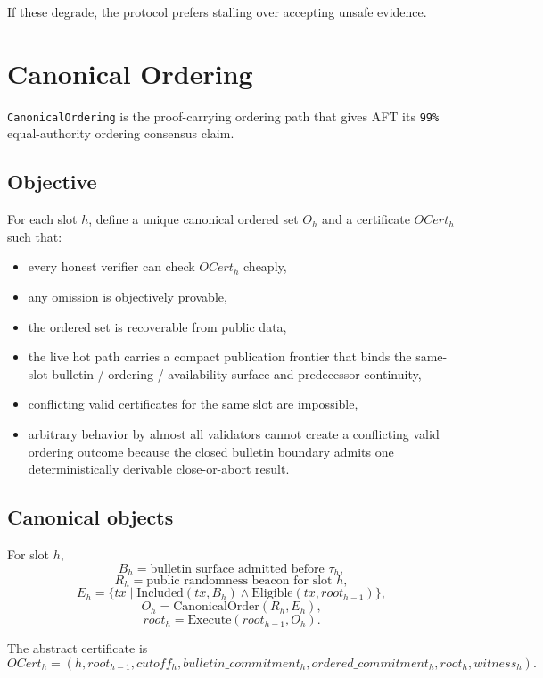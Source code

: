 \documentclass[11pt]{article}
\newcommand{\AFT}{\textsc{AFT}}
\newcommand{\code}[1]{\texttt{#1}}
\newcommand{\suchthat}{\;|\;}
\begin{document}
If these degrade, the protocol prefers stalling over accepting unsafe evidence.

\section{Canonical Ordering}

\code{CanonicalOrdering} is the proof-carrying ordering path that gives
\AFT{} its \code{99\%} equal-authority ordering consensus claim.

\subsection{Objective}

For each slot \(h\), define a unique canonical ordered set \(O_h\) and a
certificate \(OCert_h\) such that:

\begin{itemize}[leftmargin=1.5em]
\item every honest verifier can check \(OCert_h\) cheaply,
\item any omission is objectively provable,
\item the ordered set is recoverable from public data,
\item the live hot path carries a compact publication frontier that binds the
same-slot bulletin / ordering / availability surface and predecessor
continuity,
\item conflicting valid certificates for the same slot are impossible,
\item arbitrary behavior by almost all validators cannot create a conflicting
valid ordering outcome because the closed bulletin boundary admits one
deterministically derivable close-or-abort result.
\end{itemize}

\subsection{Canonical objects}

For slot \(h\),
\[
B_h = \text{bulletin surface admitted before }\tau_h,
\]
\[
R_h = \text{public randomness beacon for slot }h,
\]
\[
E_h = \{tx \suchthat \mathrm{Included}(tx, B_h) \wedge \mathrm{Eligible}(tx, root_{h-1})\},
\]
\[
O_h = \mathrm{CanonicalOrder}(R_h, E_h),
\]
\[
root_h = \mathrm{Execute}(root_{h-1}, O_h).
\]

The abstract certificate is
\[
OCert_h =
\left(
  h,
  root_{h-1},
  cutoff_h,
  bulletin\_commitment_h,
  ordered\_commitment_h,
  root_h,
  witness_h
\right).
\]
\end{document}
